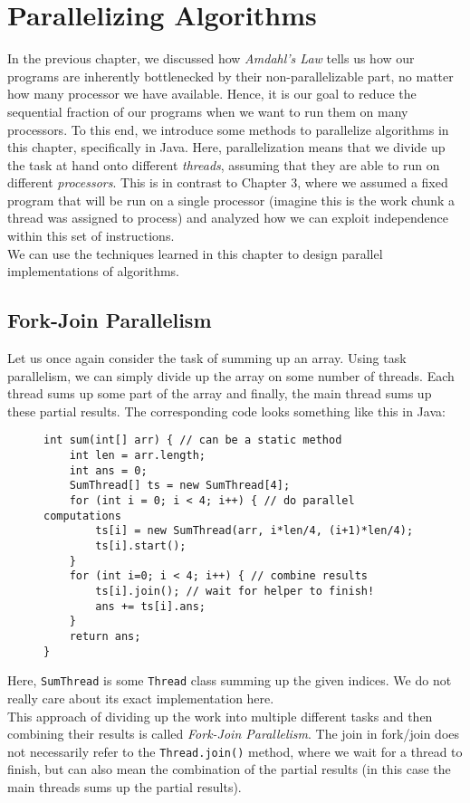 \documentclass[main.tex]{subfiles}
\begin{document}
\addtolength{\tabcolsep}{-2pt}

\section{Parallelizing Algorithms}
In the previous chapter, we discussed how \textit{Amdahl's Law} tells us how our programs are inherently bottlenecked by their non-parallelizable part, no matter how many processor we have available. Hence, it is our goal to reduce the sequential fraction of our programs when we want to run them on many processors. To this end, we introduce some methods to parallelize algorithms in this chapter, specifically in Java. Here, parallelization means that we divide up the task at hand onto different \textit{threads}, assuming that they are able to run on different \textit{processors}. This is in contrast to Chapter 3, where we assumed a fixed program that will be run on a single processor (imagine this is the work chunk a thread was assigned to process) and analyzed how we can exploit independence within this set of instructions.\\
We can use the techniques learned in this chapter to design parallel implementations of algorithms.

\subsection{Fork-Join Parallelism}
Let us once again consider the task of summing up an array. Using task parallelism, we can simply divide up the array on some number of threads. Each thread sums up some part of the array and finally, the main thread sums up these partial results. The corresponding code looks something like this in Java:
\begin{figure}[H]
    \begin{verbatim}
int sum(int[] arr) { // can be a static method
    int len = arr.length;
    int ans = 0;
    SumThread[] ts = new SumThread[4];
    for (int i = 0; i < 4; i++) { // do parallel computations
        ts[i] = new SumThread(arr, i*len/4, (i+1)*len/4);
        ts[i].start();
    }
    for (int i=0; i < 4; i++) { // combine results
        ts[i].join(); // wait for helper to finish!
        ans += ts[i].ans;
    }
    return ans;
}
    \end{verbatim}
\end{figure}
\noindent Here, \texttt{SumThread} is some \texttt{Thread} class summing up the given indices. We do not really care about its exact implementation here.\\[3mm]
This approach of dividing up the work into multiple different tasks and then combining their results is called \textit{Fork-Join Parallelism}. The join in fork/join does not necessarily refer to the \texttt{Thread.join()} method, where we wait for a thread to finish, but can also mean the combination of the partial results (in this case the main threads sums up the partial results).
\end{document}
